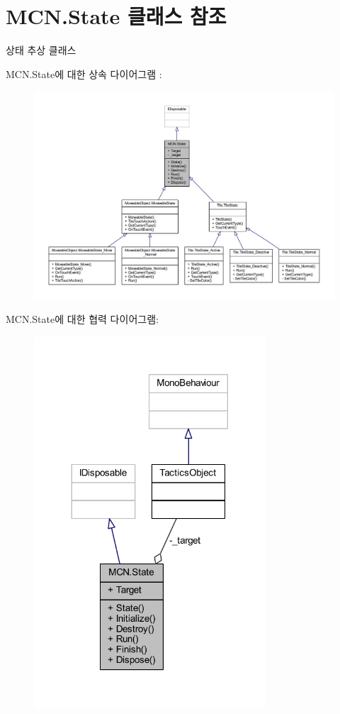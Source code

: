 \hypertarget{class_m_c_n_1_1_state}{}\section{M\+C\+N.\+State 클래스 참조}
\label{class_m_c_n_1_1_state}


상태 추상 클래스  




M\+C\+N.\+State에 대한 상속 다이어그램 \+: \nopagebreak
\begin{figure}[H]
\begin{center}
\leavevmode
\includegraphics[width=350pt]{class_m_c_n_1_1_state__inherit__graph}
\end{center}
\end{figure}


M\+C\+N.\+State에 대한 협력 다이어그램\+:\nopagebreak
\begin{figure}[H]
\begin{center}
\leavevmode
\includegraphics[width=245pt]{class_m_c_n_1_1_state__coll__graph}
\end{center}
\end{figure}
